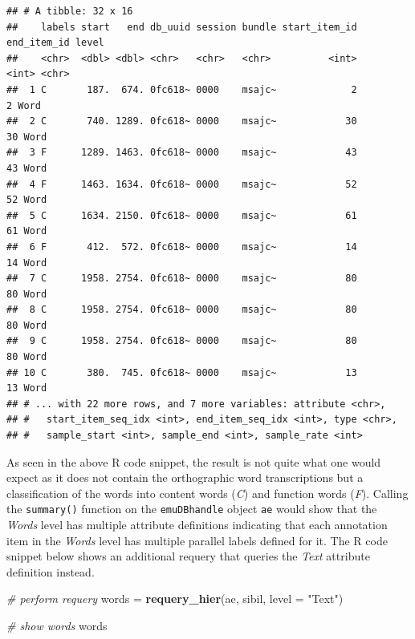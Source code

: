\documentclass[]{book}
\newenvironment{Shaded}{\begin{snugshade}}{\end{snugshade}}
\newcommand{\CommentTok}[1]{\textcolor[rgb]{0.56,0.35,0.01}{\textit{#1}}}
\newcommand{\DataTypeTok}[1]{\textcolor[rgb]{0.13,0.29,0.53}{#1}}
\newcommand{\KeywordTok}[1]{\textcolor[rgb]{0.13,0.29,0.53}{\textbf{#1}}}
\newcommand{\NormalTok}[1]{#1}
\newcommand{\StringTok}[1]{\textcolor[rgb]{0.31,0.60,0.02}{#1}}
\begin{document}
\begin{verbatim}
## # A tibble: 32 x 16
##    labels start   end db_uuid session bundle start_item_id end_item_id level
##    <chr>  <dbl> <dbl> <chr>   <chr>   <chr>          <int>       <int> <chr>
##  1 C       187.  674. 0fc618~ 0000    msajc~             2           2 Word 
##  2 C       740. 1289. 0fc618~ 0000    msajc~            30          30 Word 
##  3 F      1289. 1463. 0fc618~ 0000    msajc~            43          43 Word 
##  4 F      1463. 1634. 0fc618~ 0000    msajc~            52          52 Word 
##  5 C      1634. 2150. 0fc618~ 0000    msajc~            61          61 Word 
##  6 F       412.  572. 0fc618~ 0000    msajc~            14          14 Word 
##  7 C      1958. 2754. 0fc618~ 0000    msajc~            80          80 Word 
##  8 C      1958. 2754. 0fc618~ 0000    msajc~            80          80 Word 
##  9 C      1958. 2754. 0fc618~ 0000    msajc~            80          80 Word 
## 10 C       380.  745. 0fc618~ 0000    msajc~            13          13 Word 
## # ... with 22 more rows, and 7 more variables: attribute <chr>,
## #   start_item_seq_idx <int>, end_item_seq_idx <int>, type <chr>,
## #   sample_start <int>, sample_end <int>, sample_rate <int>
\end{verbatim}

As seen in the above R code snippet, the result is not quite what one would expect as it does not contain the orthographic word transcriptions but a classification of the words into content words (\emph{C}) and function words (\emph{F}). Calling the \texttt{summary()} function on the \texttt{emuDBhandle} object \texttt{ae} would show that the \emph{Words} level has multiple attribute definitions indicating that each annotation item in the \emph{Words} level has multiple parallel labels defined for it. The R code snippet below shows an additional requery that queries the \emph{Text} attribute definition instead.

\begin{Shaded}
\begin{Highlighting}[]
\CommentTok{# perform requery}
\NormalTok{words =}\StringTok{ }\KeywordTok{requery_hier}\NormalTok{(ae, sibil, }\DataTypeTok{level =} \StringTok{"Text"}\NormalTok{)}

\CommentTok{# show words}
\NormalTok{words}
\end{Highlighting}
\end{Shaded}
\end{document}
